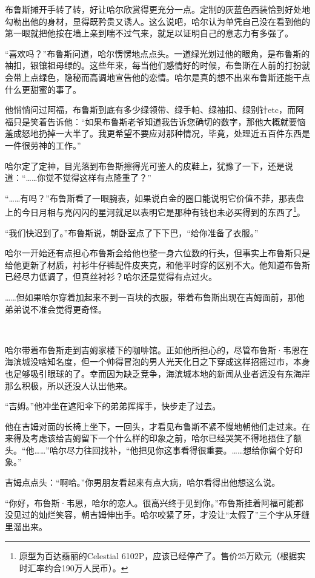 \documentclass[../main]{subfiles}
\begin{document}
布鲁斯摊开手转了转，好让哈尔欣赏得更充分一点。定制的灰蓝色西装恰到好处地勾勒出他的身材，显得既矜贵又诱人。这么说吧，哈尔认为单凭自己没在看到他的第一眼就把他按在墙上亲到喘不过气来，就足以证明自己的意志力有多强了。

“喜欢吗？”布鲁斯问道，哈尔愣愣地点点头。一道绿光划过他的眼角，是布鲁斯的袖扣，银镶祖母绿的。这些年来，每当他们感情好的时候，布鲁斯在人前的打扮就会带上点绿色，隐秘而高调地宣告他的恋情。哈尔是真的想不出来布鲁斯还能干点什么更甜蜜的事了。

他悄悄问过阿福，布鲁斯到底有多少绿领带、绿手帕、绿袖扣、绿别针etc，而阿福只是笑着告诉他：“如果布鲁斯老爷知道我告诉您确切的数字，那他大概就要恼羞成怒地扔掉一大半了。我更希望不要应对那种情况，毕竟，处理近五百件东西是一件很劳神的工作。”

哈尔定了定神，目光落到布鲁斯擦得光可鉴人的皮鞋上，犹豫了一下，还是说道：“……你觉不觉得这样有点隆重了？”

“……有吗？”布鲁斯看了一眼腕表，如果说白金的圈口能说明它价值不菲，那表盘上的今日月相与亮闪闪的星河就足以表明它是那种有钱也未必买得到的东西了\footnote[1]{原型为百达翡丽的Celestial 6102P，应该已经停产了。售价25万欧元（根据实时汇率约合190万人民币）。}。

“我们快迟到了。”布鲁斯说，朝卧室点了下下巴，“给你准备了衣服。”

哈尔一开始还有点担心布鲁斯会给他也整一身六位数的行头，但事实上布鲁斯只是给他更新了材质，衬衫牛仔裤配件皮夹克，和他平时穿的区别不大。他知道布鲁斯已经尽力低调了，但真丝衬衫？哈尔还是觉得有点过火。

……但如果哈尔穿着加起来不到一百块的衣服，带着布鲁斯出现在吉姆面前，那他弟弟说不准会觉得更奇怪。

~\

哈尔带着布鲁斯走到吉姆家楼下的咖啡馆。正如他所担心的，尽管布鲁斯·韦恩在海滨城没啥知名度，但一个帅得冒泡的男人光天化日之下穿成这样招摇过市，本身也足够吸引眼球的了。幸而因为缺乏竞争，海滨城本地的新闻从业者远没有东海岸那么积极，所以还没人认出他来。

“吉姆。”他冲坐在遮阳伞下的弟弟挥挥手，快步走了过去。

他在吉姆对面的长椅上坐下，一回头，才看见布鲁斯不紧不慢地朝他们走过来。在来得及考虑该给吉姆留下一个什么样的印象之前，哈尔已经哭笑不得地捂住了额头。“他……”哈尔尽力往回找补，“他把见你这事看得很重要。……想给你留个好印象。”

吉姆点点头：“啊哈。”你男朋友看起来有点大病，哈尔看得出他想这么说。

“你好，布鲁斯·韦恩，哈尔的恋人。很高兴终于见到你。”布鲁斯挂着阿福可能都没见过的灿烂笑容，朝吉姆伸出手。哈尔咬紧了牙，才没让“太假了”三个字从牙缝里溜出来。
\end{document}
